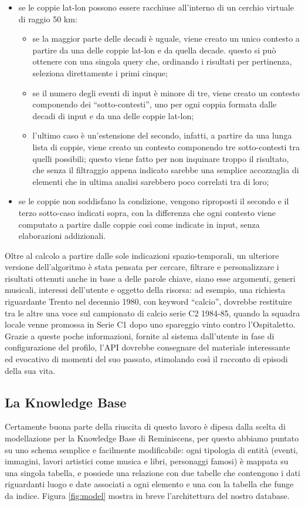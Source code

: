 \documentclass[sigproc-sp.tex]{subfiles}
\begin{document}
\begin{itemize}
\item se le coppie lat-lon possono essere racchiuse all’interno di un cerchio virtuale di raggio 50 km:
\begin{itemize}
\item se la maggior parte delle decadi è uguale, viene creato un unico contesto a partire da una delle coppie lat-lon e da quella decade. questo si può ottenere con una singola query che, ordinando i risultati per pertinenza, seleziona direttamente i primi cinque;
\item se il numero degli eventi di input è minore di tre, viene creato un contesto componendo dei “sotto-contesti”, uno per ogni coppia formata dalle decadi di input e da una delle coppie lat-lon;
\item l’ultimo caso è un’estensione del secondo, infatti, a partire da una lunga lista di coppie, viene creato un contesto componendo tre sotto-contesti tra quelli possibili; questo viene fatto per non inquinare troppo il risultato, che senza il filtraggio appena indicato sarebbe una semplice accozzaglia di elementi che in ultima analisi sarebbero poco correlati tra di loro;
\end{itemize}
\item se le coppie non soddisfano la condizione, vengono riproposti il secondo e il terzo sotto-caso indicati sopra, con la differenza che ogni contesto viene computato a partire dalle coppie così come indicate in input, senza elaborazioni addizionali.
\end{itemize}

Oltre al calcolo a partire dalle sole indicazioni spazio-temporali, un ulteriore versione dell’algoritmo è stata pensata per cercare, filtrare e personalizzare i risultati ottenuti anche in base a delle parole chiave, siano esse argomenti, generi musicali, interessi dell’utente e oggetto della risorsa: ad esempio, una richiesta riguardante Trento nel decennio 1980, con keyword “calcio”, dovrebbe restituire tra le altre una voce sul campionato di calcio serie C2 1984-85, quando la squadra locale venne promossa in Serie C1 dopo uno spareggio vinto contro l'Ospitaletto.
Grazie a queste poche informazioni, fornite al sistema dall’utente in fase di configurazione del profilo, l’API dovrebbe consegnare del materiale interessante ed evocativo di momenti del suo passato, stimolando così il racconto di episodi della sua vita.

\subsection{La Knowledge Base}
Certamente buona parte della riuscita di questo lavoro è dipesa dalla scelta di modellazione per la Knowledge Base di Reminiscens, per questo abbiamo puntato su uno schema semplice e facilmente modificabile: ogni tipologia di entità (eventi, immagini, lavori artistici come musica e libri, personaggi famosi) è mappata su una singola tabella, e possiede una relazione con due tabelle che contengono i dati riguardanti luogo e date associati a ogni elemento e una con la tabella che funge da indice. Figura \ref{fig:model} mostra in breve l'architettura del nostro database.
\end{document}
